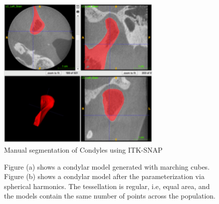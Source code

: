 \documentclass[]{spie}  %
\begin{document}
\begin{figure}
\centering 
    \includegraphics[width=0.7\textwidth]{ITKSnapCondyles.png}
    \caption{Manual segmentation of Condyles using ITK-SNAP}
    \label{fig:itkSnapCondyle}
\end{figure} 
\begin{figure}
\centering 
    \caption{Figure (a) shows a condylar model generated with marching cubes. Figure (b) shows a condylar model 
    after the parameterization via spherical harmonics. The tessellation is regular, i.e, equal area, and the models contain the same
    number of points across the population.}
    \label{fig:result_bi}
\end{figure} 
\end{document}
